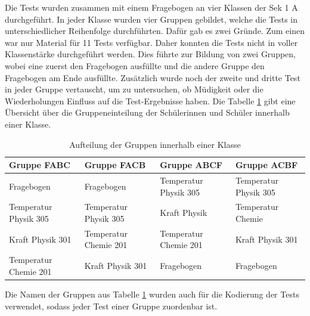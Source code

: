 Die Tests wurden zusammen mit einem Fragebogen an vier Klassen der Sek 1 A durchgeführt. In jeder Klasse wurden vier Gruppen gebildet, welche die Tests in unterschiedlicher Reihenfolge durchführten. Dafür gab es zwei Gründe. Zum einen war nur Material für 11 Tests verfügbar. Daher konnten die Tests nicht in voller Klassenstärke durchgeführt werden. Dies führte zur Bildung von zwei Gruppen, wobei eine zuerst den Fragebogen ausfüllte und die andere Gruppe den Fragebogen am Ende ausfüllte. Zusätzlich wurde noch der zweite und dritte Test in jeder Gruppe vertauscht, um zu untersuchen, ob Müdigkeit oder die Wiederholungen Einfluss auf die Test-Ergebnisse haben. Die Tabelle \ref{tab:Gruppenaufteilung} gibt eine Übersicht über die Gruppeneinteilung der Schülerinnen und Schüler innerhalb einer Klasse.
\begin{table}[htbp]
  \centering
  \begin{tabular}{@{}p{3.1cm}p{3.1cm}p{3.1cm}p{3.1cm}@{}}
  \toprule
   Gruppe FABC & Gruppe FACB & Gruppe ABCF & Gruppe ACBF \\ 
  \midrule
   Fragebogen & Fragebogen & Temperatur \newline  Physik 305 & Temperatur \newline  Physik 305 \\[0.2cm]
   Temperatur \newline  Physik 305 & Temperatur \newline  Physik 305 & Kraft \newline  Physik & Temperatur Chemie \\ [0.2cm]
   Kraft  \newline Physik 301 & Temperatur \newline  Chemie 201 & Temperatur \newline  Chemie 201 & Kraft \newline  Physik 301 \\ [0.2cm]
   Temperatur \newline  Chemie 201 & Kraft \newline  Physik 301 & Fragebogen& Fragebogen\\ 
   
  \bottomrule
  \end{tabular} 
  \caption{Aufteilung der Gruppen innerhalb einer Klasse}
  \label{tab:Gruppenaufteilung}
\end{table}

Die Namen der Gruppen aus Tabelle \ref{tab:Gruppenaufteilung} wurden auch für die Kodierung der Tests verwendet, sodass jeder Test einer Gruppe zuordenbar ist.


